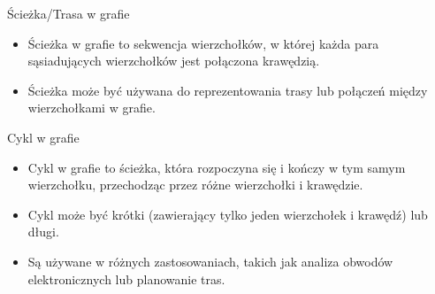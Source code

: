 \documentclass[polish,envcountsect,10pt]{beamer}
\begin{document}
\begin{frame}{Ścieżka/Trasa w grafie}
    \begin{itemize}
        \item Ścieżka w grafie to sekwencja wierzchołków, w której każda para sąsiadujących wierzchołków jest połączona krawędzią.
        \item Ścieżka może być używana do reprezentowania trasy lub połączeń między wierzchołkami w grafie.
    \end{itemize}  
    \begin{center}
    \end{center}
\end{frame}

\begin{frame}{Cykl w grafie}
    \begin{itemize}
        \item Cykl w grafie to ścieżka, która rozpoczyna się i kończy w tym samym wierzchołku, przechodząc przez różne wierzchołki i krawędzie.
        \item Cykl może być krótki (zawierający tylko jeden wierzchołek i krawędź) lub długi.
        \item Są używane w różnych zastosowaniach, takich jak analiza obwodów elektronicznych lub planowanie tras.
    \end{itemize}  
    \begin{center}
    \end{center}
\end{frame}
\end{document}
